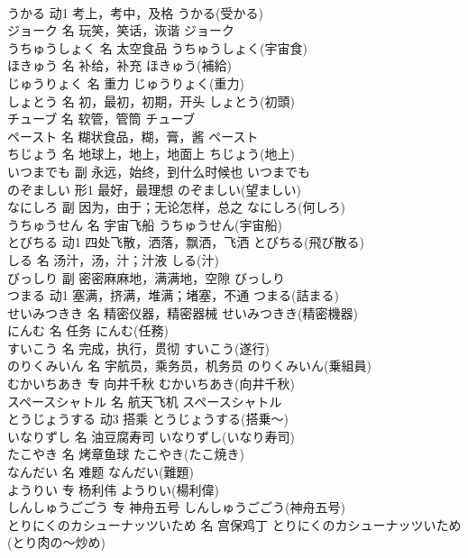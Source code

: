 \documentclass[8pt]{extreport}
\begin{document}
\begin{CJK}{UTF8}{min}
\\	うかる	动1	考上，考中，及格	うかる(受かる)	
\\	ジョーク	名	玩笑，笑话，诙谐	ジョーク	
\\	うちゅうしょく	名	太空食品	うちゅうしょく(宇宙食)	
\\	ほきゅう	名	补给，补充	ほきゅう(補給)	
\\	じゅうりょく	名	重力	じゅうりょく(重力)	
\\	しょとう	名	初，最初，初期，开头	しょとう(初頭)	
\\	チューブ	名	软管，管筒	チューブ	
\\	ペースト	名	糊状食品，糊，膏，酱	ペースト	
\\	ちじょう	名	地球上，地上，地面上	ちじょう(地上)	
\\	いつまでも	副	永远，始终，到什么时候也	いつまでも	
\\	のぞましい	形1	最好，最理想	のぞましい(望ましい)	
\\	なにしろ	副	因为，由于；无论怎样，总之	なにしろ(何しろ)	
\\	うちゅうせん	名	宇宙飞船	うちゅうせん(宇宙船)	
\\	とびちる	动1	四处飞散，洒落，飘洒，飞洒	とびちる(飛び散る)	
\\	しる	名	汤汁，汤，汁；汁液	しる(汁)	
\\	びっしり	副	密密麻麻地，满满地，空隙	びっしり	
\\	つまる	动1	塞满，挤满，堆满；堵塞，不通	つまる(詰まる)	
\\	せいみつきき	名	精密仪器，精密器械	せいみつきき(精密機器)	
\\	にんむ	名	任务	にんむ(任務)	
\\	すいこう	名	完成，执行，贯彻	すいこう(遂行)	
\\	のりくみいん	名	宇航员，乘务员，机务员	のりくみいん(乗組員)	
\\	むかいちあき	专	向井千秋	むかいちあき(向井千秋)	
\\	スペースシャトル	名	航天飞机	スペースシャトル	
\\	とうじょうする	动3	搭乘	とうじょうする(搭乗～)	
\\	いなりずし	名	油豆腐寿司	いなりずし(いなり寿司)	
\\	たこやき	名	烤章鱼球	たこやき(たこ焼き)	
\\	なんだい	名	难题	なんだい(難題)	
\\	ようりい	专	杨利伟	ようりい(楊利偉)	
\\	しんしゅうごごう	专	神舟五号	しんしゅうごごう(神舟五号)	
\\	とりにくのカシューナッツいため	名	宫保鸡丁	とりにくのカシューナッツいため(とり肉の～炒め)	

\end{CJK}
\end{document}
